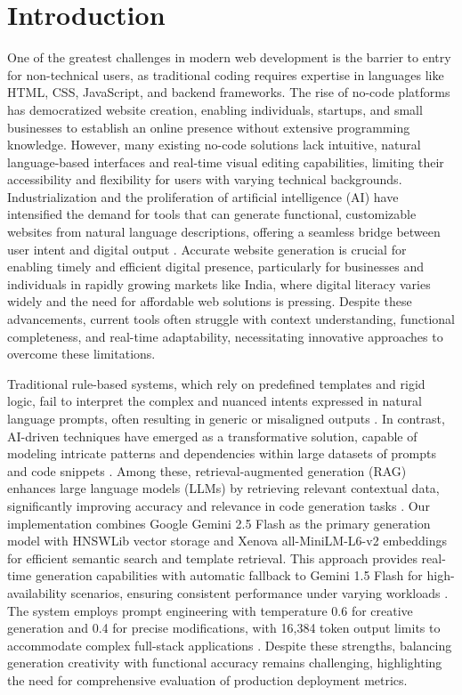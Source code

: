 \documentclass[10pt, conference, letterpaper]{IEEEtran}
\begin{document}
\section{Introduction}
One of the greatest challenges in modern web development is the barrier to entry for non-technical users, as traditional coding requires expertise in languages like HTML, CSS, JavaScript, and backend frameworks. The rise of no-code platforms has democratized website creation, enabling individuals, startups, and small businesses to establish an online presence without extensive programming knowledge. However, many existing no-code solutions lack intuitive, natural language-based interfaces and real-time visual editing capabilities, limiting their accessibility and flexibility for users with varying technical backgrounds. Industrialization and the proliferation of artificial intelligence (AI) have intensified the demand for tools that can generate functional, customizable websites from natural language descriptions, offering a seamless bridge between user intent and digital output \cite{ding2025frontend}. Accurate website generation is crucial for enabling timely and efficient digital presence, particularly for businesses and individuals in rapidly growing markets like India, where digital literacy varies widely and the need for affordable web solutions is pressing. Despite these advancements, current tools often struggle with context understanding, functional completeness, and real-time adaptability, necessitating innovative approaches to overcome these limitations.

Traditional rule-based systems, which rely on predefined templates and rigid logic, fail to interpret the complex and nuanced intents expressed in natural language prompts, often resulting in generic or misaligned outputs \cite{xie2025prompt}. In contrast, AI-driven techniques have emerged as a transformative solution, capable of modeling intricate patterns and dependencies within large datasets of prompts and code snippets \cite{lu2025webgen}. Among these, retrieval-augmented generation (RAG) enhances large language models (LLMs) by retrieving relevant contextual data, significantly improving accuracy and relevance in code generation tasks \cite{singla2025prompt}. Our implementation combines Google Gemini 2.5 Flash as the primary generation model with HNSWLib vector storage and Xenova all-MiniLM-L6-v2 embeddings for efficient semantic search and template retrieval. This approach provides real-time generation capabilities with automatic fallback to Gemini 1.5 Flash for high-availability scenarios, ensuring consistent performance under varying workloads \cite{frolov2025promptmap}. The system employs prompt engineering with temperature 0.6 for creative generation and 0.4 for precise modifications, with 16,384 token output limits to accommodate complex full-stack applications \cite{wan2024automatically}. Despite these strengths, balancing generation creativity with functional accuracy remains challenging, highlighting the need for comprehensive evaluation of production deployment metrics.
\end{document}
